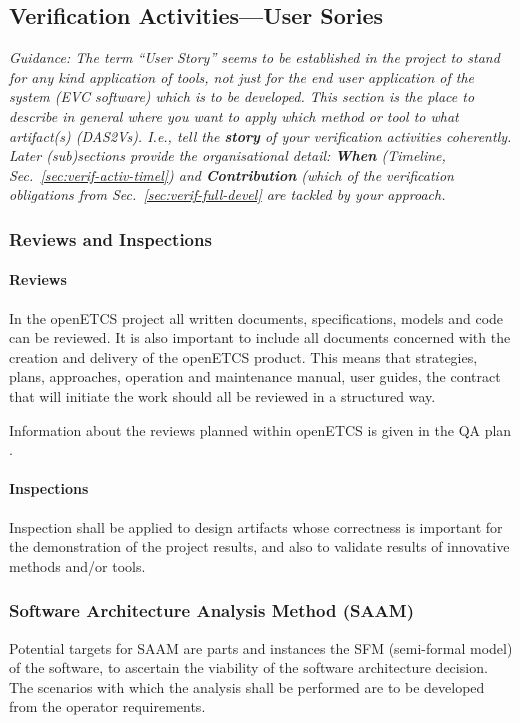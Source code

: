 \documentclass{template/openetcs_report}
\begin{document}
\subsection{Verification Activities---User Sories}
\label{sec:verif-activ-user}

\emph{Guidance: The term ``User Story'' seems to be established in the
project to stand for any kind application of tools, not just for the
end user application of the system (EVC software) which is to be
developed. This section is the place to describe in general where you
want to apply which method or tool to what artifact(s) (DAS2Vs). I.e.,
tell the \textbf{story} of your verification activities coherently. Later
(sub)sections provide the organisational detail: \textbf{When} (Timeline,
Sec.~\ref{sec:verif-activ-timel}) and 
\textbf{Contribution} (which of the verification obligations from
Sec.~\ref{sec:verif-full-devel} are tackled by your approach.}


\subsubsection{Reviews and Inspections}
\label{sec:reviews-inspec-openETCS}

\paragraph{Reviews}
In the openETCS project
all written documents, specifications, models and code can be
reviewed. It is also important to include all documents concerned with
the creation and delivery of the openETCS product. This means that
strategies, plans, approaches, operation and maintenance manual, user
guides, the contract that will initiate the work should all be
reviewed in a structured way. 

Information about the reviews planned within openETCS is given in the
QA plan \cite{QAPlan}.

\paragraph{Inspections}
Inspection shall be applied to design artifacts whose correctness
is important for the demonstration of the project results, and also
to validate results of innovative \vv methods and/or tools.


\subsubsection{Software Architecture Analysis Method (SAAM)}
\label{sec:saam-openETCS}
Potential targets for SAAM are parts and instances the SFM 
(semi-formal model) of the software, to ascertain the 
viability of the software architecture decision. The scenarios 
with which the analysis shall be performed are to be developed
from the operator requirements.
\end{document}
